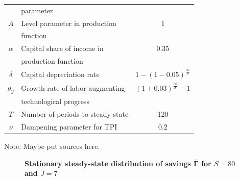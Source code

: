 \documentclass[letterpaper,12pt]{article}
\theoremstyle{definition}
\begin{document}
\begin{spacing}{1.5}
\begin{table}[htbp]
\begin{threeparttable}
\begin{tabular}{>{\small}c |>{\small}l |>{\small}c}
        & \quad parameter & \\
        $A$ & Level parameter in production & 1 \\
        & \quad function & \\
        $\alpha$ & Capital share of income in & 0.35 \\
        & \quad production function & \\
        $\delta$ & Capital depreciation rate & $1-(1-0.05)^\frac{80}{S}$ \\
        $g_y$ & Growth rate of labor augmenting & $(1+0.03)^\frac{80}{S}-1$ \\
        & \quad technological progress & \\
        $T$ & Number of periods to steady state & 120 \\
        $\nu$ & Dampening parameter for TPI & 0.2 \\
        \hline\hline
      \end{tabular}
      \begin{tablenotes}
        \scriptsize{\item[]Note: Maybe put sources here.}
      \end{tablenotes}
      \end{threeparttable}
    \end{table}

    \begin{figure}[htb]\centering \captionsetup{width=4.0in}
      \caption{\label{FigSavSS}\textbf{Stationary steady-state distribution of savings $\bar{\bm{\Gamma}}$ for $S=80$ and $J=7$}}
    \end{figure}


\end{spacing}
\end{document}
